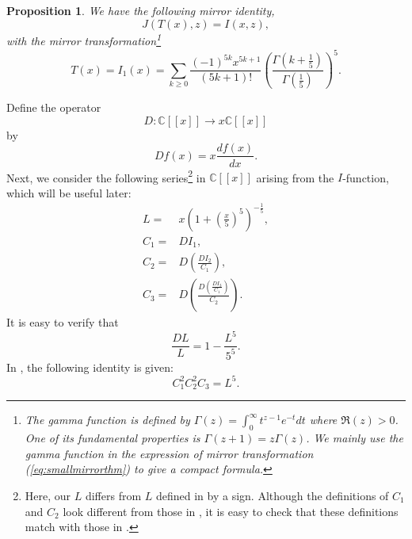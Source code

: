 \documentclass[12pt]{amsart}
\newtheorem{prop}{Proposition}[section]
\numberwithin{equation}{section}
\begin{document}
\begin{prop} We have the following mirror identity,
\begin{equation}\label{eq:smallmirrorthm}
J\left(T(x),z\right)=I(x,z),
\end{equation}
with the mirror transformation\footnote{The gamma function is defined by $\Gamma(z)=\int_0^{\infty} t^{z-1} e^{-t} d t$ where $\Re(z)>0$. One of its fundamental properties is $\Gamma (z+1)=z \Gamma (z)$. We mainly use the gamma function in the expression of mirror transformation (\ref{eq:smallmirrorthm}) to give a compact formula.}
\begin{equation}\label{eq:mirrortransform}
T(x)=I_1(x)=\sum_{k\geq 0}\frac{(-1)^{5k}x^{5k+1}}{(5k+1)!}\left(\frac{\Gamma\left(k+\frac{1}{5}\right)}{\Gamma\left(\frac{1}{5}\right)}\right)^5.
\end{equation}
\end{prop}
Define the operator $$D:\mathbb{C}[[x]]\rightarrow x\mathbb{C}[[x]]$$ by
\begin{equation*}
Df(x)=x\frac{df(x)}{dx}.
\end{equation*}
Next, we consider the following series\footnote{Here, our $L$ differs from $L$ defined in \cite{lho} by a sign. Although the definitions of $C_1$ and $C_2$ look different from those in \cite{lho}, it is easy to check that these definitions match with those in \cite{lho}.} in $\mathbb{C}[[x]]$ arising from the $I$-function, which will be useful later:
\begin{equation}
\begin{aligned}
L=&x\left(1+\left(\frac{x}{5}\right)^5\right)^{-\frac{1}{5}},\\
C_1=&DI_1,\\
C_2=&D\left(\frac{DI_2}{C_1}\right),\\
C_3=&D\left(\frac{D\left(\frac{DI_3}{C_1}\right)}{C_2}\right).
\end{aligned}
\end{equation}
It is easy to verify that
\begin{equation}\label{eq:DLoverL}
\frac{DL}{L}=1-\frac{L^5}{5^5}.
\end{equation}
In \cite[Proposition 4]{lho}, the following identity is given:
\begin{equation}\label{eq:C12C22C3L5}
C_1^2C_2^2C_3=L^5.
\end{equation}
\end{document}
